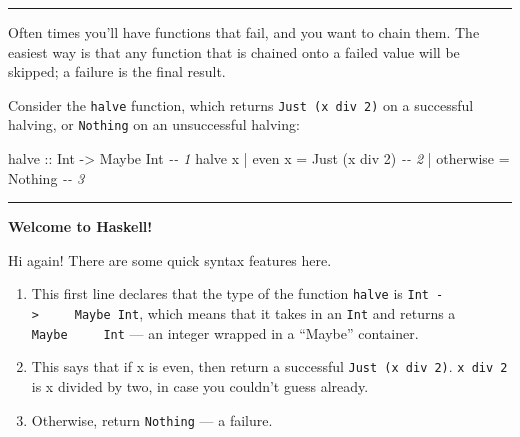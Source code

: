 \documentclass[]{article}
\newenvironment{Shaded}{}{}
\newcommand{\CommentTok}[1]{\textcolor[rgb]{0.38,0.63,0.69}{\textit{#1}}}
\newcommand{\DataTypeTok}[1]{\textcolor[rgb]{0.56,0.13,0.00}{#1}}
\newcommand{\DecValTok}[1]{\textcolor[rgb]{0.25,0.63,0.44}{#1}}
\newcommand{\FunctionTok}[1]{\textcolor[rgb]{0.02,0.16,0.49}{#1}}
\newcommand{\NormalTok}[1]{#1}
\newcommand{\OperatorTok}[1]{\textcolor[rgb]{0.40,0.40,0.40}{#1}}
\newcommand{\OtherTok}[1]{\textcolor[rgb]{0.00,0.44,0.13}{#1}}
\begin{document}
\begin{center}\rule{0.5\linewidth}{0.5pt}\end{center}

Often times you'll have functions that fail, and you want to chain them. The
easiest way is that any function that is chained onto a failed value will be
skipped; a failure is the final result.

Consider the \texttt{halve} function, which returns
\texttt{Just\ (x\ \textasciigrave{}div\textasciigrave{}\ 2)} on a successful
halving, or \texttt{Nothing} on an unsuccessful halving:

\begin{Shaded}
\begin{Highlighting}[]
\OtherTok{halve ::} \DataTypeTok{Int} \OtherTok{{-}\textgreater{}} \DataTypeTok{Maybe} \DataTypeTok{Int}                       \CommentTok{{-}{-} 1}
\NormalTok{halve x }\OperatorTok{|} \FunctionTok{even}\NormalTok{ x    }\OtherTok{=} \DataTypeTok{Just}\NormalTok{ (x }\OtherTok{\textasciigrave{}div\textasciigrave{}} \DecValTok{2}\NormalTok{)          }\CommentTok{{-}{-} 2}
        \OperatorTok{|} \FunctionTok{otherwise} \OtherTok{=} \DataTypeTok{Nothing}                   \CommentTok{{-}{-} 3}
\end{Highlighting}
\end{Shaded}

\begin{center}\rule{0.5\linewidth}{0.5pt}\end{center}

\textbf{Welcome to Haskell!}

Hi again! There are some quick syntax features here.

\begin{enumerate}
\def\labelenumi{\arabic{enumi}.}
\tightlist
\item
  This first line declares that the type of the function \texttt{halve} is
  \texttt{Int\ -\textgreater{}\ \ \ \ \ Maybe\ Int}, which means that it takes
  in an \texttt{Int} and returns a \texttt{Maybe\ \ \ \ \ Int} --- an integer
  wrapped in a ``Maybe'' container.
\item
  This says that if x is even, then return a successful
  \texttt{Just\ (x\ \textasciigrave{}div\textasciigrave{}\ 2)}.
  \texttt{x\ \textasciigrave{}div\textasciigrave{}\ 2} is x divided by two, in
  case you couldn't guess already.
\item
  Otherwise, return \texttt{Nothing} --- a failure.
\end{enumerate}
\end{document}
